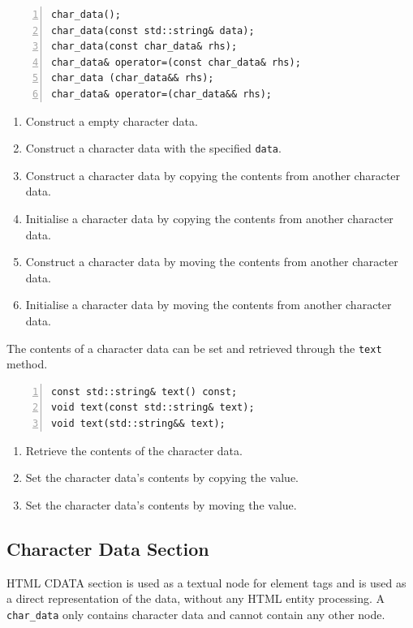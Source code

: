 \documentclass[10pt,a4paper,openany]{mudbook}
\makeatletter
\newcommand{\indextt}[2][]{\texttt{#2}\index{#2@\texttt{#2}#1}}
\newenvironment{enumeratedef}
  {\begin{enumerate}[topsep=0.5em,itemsep=0em,parsep=0em,font=\small]
     \small}
  {\end{enumerate}}
\makeatother
\begin{document}
\begin{lstlisting}[style=definition,numbers=left]
char_data();
char_data(const std::string& data);
char_data(const char_data& rhs);
char_data& operator=(const char_data& rhs);
char_data (char_data&& rhs);
char_data& operator=(char_data&& rhs);
\end{lstlisting}
\begin{enumeratedef}
  \item Construct a empty character data.
  \item Construct a character data with the specified \texttt{data}.
  \item Construct a character data by copying the contents from another
        character data.
  \item Initialise a character data by copying the contents from another
        character data.
  \item Construct a character data by moving the contents from another
        character data.
  \item Initialise a character data by moving the contents from another
        character data.
\end{enumeratedef}

The contents of a character data can be set and retrieved through the
\indextt{text} method.

\begin{lstlisting}[style=definition,numbers=left]
const std::string& text() const;
void text(const std::string& text);
void text(std::string&& text);
\end{lstlisting}
\begin{enumeratedef}
  \item Retrieve the contents of the character data.
  \item Set the character data's contents by copying the value.
  \item Set the character data's contents by moving the value.
\end{enumeratedef}

\subsection{Character Data Section}

HTML CDATA section is used as a textual node for element tags and is used as
a direct representation of the data, without any HTML entity processing. A
\indextt{char\_data} only contains character data and cannot contain any
other node.
\end{document}
